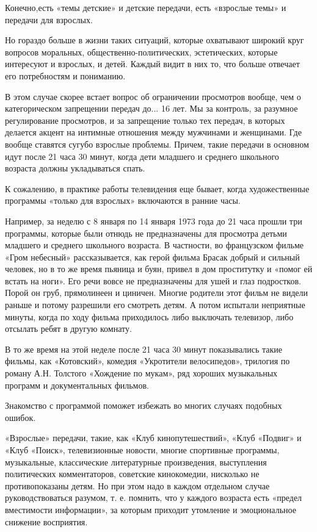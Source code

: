 \documentclass[12pt, a4paper, openany]{book}
\begin{document}
Конечно,есть «темы детские» и детские передачи, есть «взрослые темы» и передачи для взрослых. 

Но гораздо больше в жизни таких ситуаций, которые охватывают широкий круг вопросов моральных, общественно-политических, эстетических, которые интересуют и взрослых, и детей. Каждый видит в них то, что больше отвечает его потребностям и пониманию. 

В этом случае скорее встает вопрос об ограничении просмотров вообще, чем о категорическом запрещении передач до... 16 лет. Мы за контроль, за разумное регулирование просмотров, и за запрещение только тех передач, в которых делается акцент на интимные отношения между мужчинами и женщинами. Где вообще ставятся сугубо взрослые проблемы. Причем, такие передачи в основном идут после 21 часа 30 минут, когда дети младшего и среднего школьного возраста должны укладываться спать. 

К сожалению, в практике работы телевидения еще бывает, когда художественные программы «только для взрослых» включаются в ранние часы. 

Например, за неделю с 8 января по 14 января 1973 года до 21 часа прошли три программы, которые были отнюдь не предназначены для просмотра детьми младшего и среднего школьного возраста. В частности, во французском фильме «Гром небесный» рассказывается, как герой фильма Брасак добрый и сильный человек, но в то же время пьяница и буян, привел в дом проститутку и «помог ей встать на ноги». Его речи вовсе не предназначены для ушей и глаз подростков. Порой он груб, прямолинеен и циничен. Многие родители этот фильм не видели раньше и потому разрешили его смотреть детям. А потом испытали неприятные минуты, когда по ходу фильма приходилось либо выключать телевизор, либо отсылать ребят в другую комнату. 

В то же время на этой неделе после 21 часа 30 минут показывались такие фильмы, как «Котовский», комедия «Укротители велосипедов», трилогия по роману А.Н. Толстого «Хождение по мукам», ряд хороших музыкальных программ и документальных фильмов. 

Знакомство с программой поможет избежать во многих случаях подобных ошибок. 

«Взрослые» передачи, такие, как «Клуб кинопутешествий», «Клуб «Подвиг» и «Клуб «Поиск», телевизионные новости, многие спортивные программы, музыкальные, классические литературные произведения, выступления политических комментаторов, советские кинокомедии, нисколько не противопоказаны детям. Но при этом надо в каждом отдельном случае руководствоваться разумом, т. е. помнить, что у каждого возраста есть «предел вместимости информации», за которым приходит утомление и эмоциональное снижение восприятия. 
\end{document}
